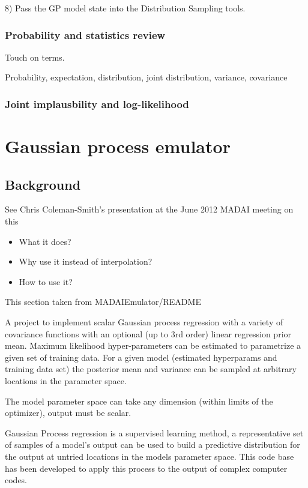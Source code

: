 \documentclass{article}
\begin{document}
8) Pass the GP model state into the Distribution Sampling tools.

\subsubsection{Probability and statistics review}

Touch on terms.

Probability, expectation, distribution, joint distribution, variance,
covariance

\subsubsection{Joint implausbility and log-likelihood}

\section{Gaussian process emulator}

\subsection{Background}

See Chris Coleman-Smith's presentation at the June 2012 MADAI meeting on this

\begin{itemize}

\item What it does?

\item Why use it instead of interpolation?

\item How to use it?

\end{itemize}

This section taken from MADAIEmulator/README

A project to implement scalar Gaussian process regression with a
variety of covariance functions with an optional (up to 3rd order)
linear regression prior mean. Maximum likelihood hyper-parameters can
be estimated to parametrize a given set of training data. For a given
model (estimated hyperparams and training data set) the posterior mean
and variance can be sampled at arbitrary locations in the parameter
space.

The model parameter space can take any dimension (within limits of the
optimizer), output must be scalar.

Gaussian Process regression is a supervised learning method, a
representative set of samples of a model's output can be used to build
a predictive distribution for the output at untried locations in the
models parameter space. This code base has been developed to apply
this process to the output of complex computer codes.
\end{document}
